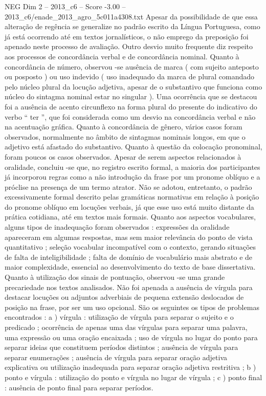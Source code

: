 \begin{textsample}{NEG Dim 2 – 2013\_c6 – Score -3.00 – 2013\_c6/enade\_2013\_agro\_5c011a4308.txt}
Apesar da possibilidade de que essa alteração de regência se generalize no padrão escrito da Língua Portuguesa, como já está ocorrendo até em textos jornalísticos, o não emprego da preposição foi apenado neste processo de avaliação.
Outro desvio muito frequente diz respeito aos processos de concordância verbal e de concordância nominal.
Quanto à concordância de número, observou -se ausência de marca ( com sujeito anteposto ou posposto ) ou uso indevido ( uso inadequado da marca de plural comandado pelo núcleo plural da locução adjetiva, apesar de o substantivo que funciona como núcleo do sintagma nominal estar no singular ).
Uma ocorrência que se destacou foi a ausência de acento circunflexo na forma plural do presente do indicativo do verbo “ ter ”, que foi considerada como um desvio na concordância verbal e não na acentuação gráfica.
Quanto à concordância de gênero, vários casos foram observados, normalmente no âmbito de sintagmas nominais longos, em que o adjetivo está afastado do substantivo.
Quanto à questão da colocação pronominal, foram poucos os casos observados.
Apesar de serem aspectos relacionados à oralidade, concluiu -se que, no registro escrito formal, a maioria dos participantes já incorporou regras como a não introdução da frase por um pronome oblíquo e a próclise na presença de um termo atrator.
Não se adotou, entretanto, o padrão excessivamente formal descrito pelas gramáticas normativas em relação à posição do pronome oblíquo em locuções verbais, já que esse uso está muito distante da prática cotidiana, até em textos mais formais.
Quanto aos aspectos vocabulares, alguns tipos de inadequação foram observados : expressões da oralidade apareceram em algumas respostas, mas sem maior relevância do ponto de vista quantitativo ; seleção vocabular incompatível com o contexto, gerando situações de falta de inteligibilidade ; falta de domínio de vocabulário mais abstrato e de maior complexidade, essencial ao desenvolvimento do texto de base dissertativa.
Quanto à utilização dos sinais de pontuação, observou -se uma grande precariedade nos textos analisados.
Não foi apenada a ausência de vírgula para destacar locuções ou adjuntos adverbiais de pequena extensão deslocados de posição na frase, por ser um uso opcional.
São os seguintes os tipos de problemas encontrados : a ) vírgula : utilização de vírgula para separar o sujeito e o predicado ; ocorrência de apenas uma das vírgulas para separar uma palavra, uma expressão ou uma oração encaixada ; uso de vírgula no lugar do ponto para separar ideias que constituem períodos distintos ; ausência de vírgula para separar enumerações ; ausência de vírgula para separar oração adjetiva explicativa ou utilização inadequada para separar oração adjetiva restritiva ; b ) ponto e vírgula : utilização do ponto e vírgula no lugar de vírgula ; c ) ponto final : ausência de ponto final para separar períodos.

\end{textsample}
